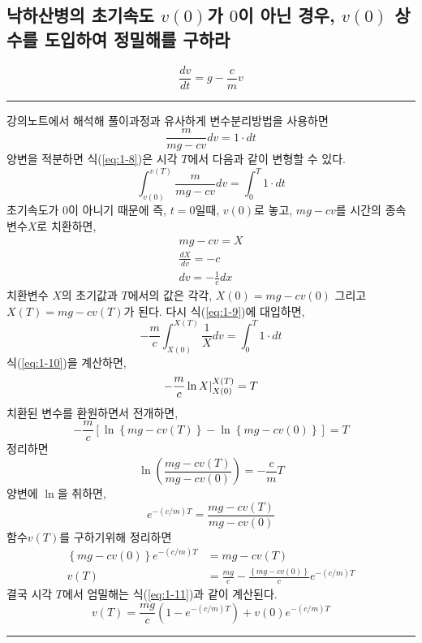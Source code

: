\documentclass{article}
\numberwithin{equation}{section}
\theoremstyle{examplestyle}
\begin{document}
\subsection{낙하산병의 초기속도 $v(0)$가 $0$이 아닌 경우, $v(0)$ 상수를 도입하여 정밀해를 구하라}
\begin{equation}
\frac{dv}{dt}=g-\frac{c}{m}v
\label{eq:1-7}
\end{equation}
\rule{\textwidth}{0.1pt}
 강의노트에서 해석해 풀이과정과 유사하게 변수분리방법을 사용하면
\begin{equation}
\frac{m}{mg-cv}dv=1\cdot dt
\label{eq:1-8}
\end{equation}
양변을 적분하면 식(\ref{eq:1-8})은 시각 $T$에서 다음과 같이 변형할 수 있다.
\begin{equation}
\int_{v(0)}^{v(T)}\frac{m}{mg-cv}dv=\int_{0}^{T}1\cdot dt
\label{eq:1-9}
\end{equation}
초기속도가 $0$이 아니기 때문에 즉, $t=0$일때, $v(0)$로 놓고, $mg-cv$를 시간의 종속변수$X$로 치환하면,
\begin{eqnarray}
mg-cv=X\\
\frac{dX}{dv}=-c\\
dv=-\frac{1}{c}dx
\end{eqnarray}
치환변수 $X$의 초기값과 $T$에서의 값은 각각, $X(0)=mg-cv(0)$ 그리고 $X(T)=mg-cv(T)$가 된다. 다시 식(\ref{eq:1-9})에 대입하면,
\begin{equation}
-\frac{m}{c}\int_{X(0)}^{X(T)}\frac{1}{X}dv=\int_{0}^{T}1\cdot dt
\label{eq:1-10}
\end{equation}
식(\ref{eq:1-10})을 계산하면,
\begin{equation}
-\frac{m}{c}\ln X\arrowvert_{X(0)}^{X(T)}=T
\end{equation}
치환된 변수를 환원하면서 전개하면,
\begin{equation}
-\frac{m}{c}\left[\ln\left\{mg-cv(T)\right\}-\ln\left\{mg-cv(0)\right\}\right] = T
\end{equation}
정리하면
\begin{equation}
\ln\left(\frac{mg-cv(T)}{mg-cv(0)}\right) = -\frac{c}{m}T
\end{equation}
양변에 $\ln$을 취하면,
\begin{equation}
e^{-(c/m)T}=\frac{mg-cv(T)}{mg-cv(0)}
\end{equation}
함수$v(T)$를 구하기위해 정리하면
\begin{align}
\left\{mg-cv(0)\right\}e^{-(c/m)T}&=mg-cv(T)\\
v(T)&=\frac{mg}{c}-\frac{\left\{mg-cv(0)\right\}}{c}e^{-(c/m)T}
\end{align}
결국 시각 $T$에서 엄밀해는 식(\ref{eq:1-11})과 같이 계산된다.
\begin{equation}
v(T)=\frac{mg}{c}\left(1-e^{-(c/m)T}\right)+v(0)e^{-(c/m)T}
\label{eq:1-11}
\end{equation}
\rule{\textwidth}{0.1pt}
\end{document}
